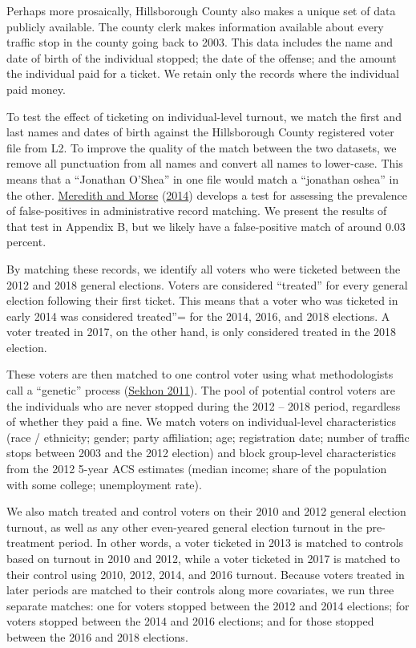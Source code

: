 \documentclass[
  12pt,
]{article}
\begin{document}
Perhaps more prosaically, Hillsborough County also makes a unique set of data publicly available. The county clerk makes information available about every traffic stop in the county going back to 2003. This data includes the name and date of birth of the individual stopped; the date of the offense; and the amount the individual paid for a ticket. We retain only the records where the individual paid money.

To test the effect of ticketing on individual-level turnout, we match the first and last names and dates of birth against the Hillsborough County registered voter file from L2. To improve the quality of the match between the two datasets, we remove all punctuation from all names and convert all names to lower-case. This means that a ``Jonathan O'Shea'' in one file would match a ``jonathan oshea'' in the other. \protect\hyperlink{ref-Meredith2014}{Meredith and Morse} (\protect\hyperlink{ref-Meredith2014}{2014}) develops a test for assessing the prevalence of false-positives in administrative record matching. We present the results of that test in Appendix B, but we likely have a false-positive match of around 0.03 percent.

By matching these records, we identify all voters who were ticketed between the 2012 and 2018 general elections. Voters are considered ``treated'' for every general election following their first ticket. This means that a voter who was ticketed in early 2014 was considered treated''= for the 2014, 2016, and 2018 elections. A voter treated in 2017, on the other hand, is only considered treated in the 2018 election.

These voters are then matched to one control voter using what methodologists call a ``genetic'' process (\protect\hyperlink{ref-Sekhon2011}{Sekhon 2011}). The pool of potential control voters are the individuals who are never stopped during the 2012 -- 2018 period, regardless of whether they paid a fine. We match voters on individual-level characteristics (race / ethnicity; gender; party affiliation; age; registration date; number of traffic stops between 2003 and the 2012 election) and block group-level characteristics from the 2012 5-year ACS estimates (median income; share of the population with some college; unemployment rate).

We also match treated and control voters on their 2010 and 2012 general election turnout, as well as any other even-yeared general election turnout in the pre-treatment period. In other words, a voter ticketed in 2013 is matched to controls based on turnout in 2010 and 2012, while a voter ticketed in 2017 is matched to their control using 2010, 2012, 2014, and 2016 turnout. Because voters treated in later periods are matched to their controls along more covariates, we run three separate matches: one for voters stopped between the 2012 and 2014 elections; for voters stopped between the 2014 and 2016 elections; and for those stopped between the 2016 and 2018 elections.
\end{document}

